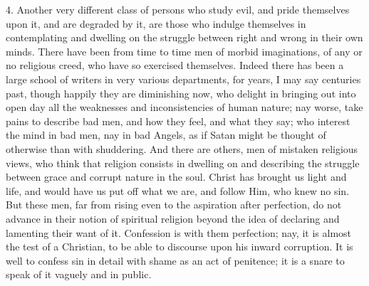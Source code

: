 4. Another very different class of persons who study evil, and
pride themselves upon it, and are degraded by it, are those who
indulge themselves in contemplating and dwelling on the struggle
between right and wrong in their own minds. There have been from time
to time men of morbid imaginations, of any or no religious creed, who
have so exercised themselves. Indeed there has been a large school of
writers in very various departments, for years, I may say centuries
past, though happily they are diminishing now, who delight in bringing
out into open day all the weaknesses and inconsistencies of human
nature; nay worse, take pains to describe bad men, and how they feel,
and what they say; who interest the mind in bad men, nay in bad
Angels, as if Satan might be thought of otherwise than with
shuddering. And there are others, men of mistaken religious views, who
think that religion consists in dwelling on and describing the
struggle between grace and corrupt nature in the soul. Christ has
brought us light and life, and would have us put off what we are,
and
follow Him, who knew no sin. But these men, far from rising even to
the aspiration after perfection, do not advance in their notion of
spiritual religion beyond the idea of declaring and lamenting their
want of it. Confession is with them perfection; nay, it is almost the
test of a Christian, to be able to discourse upon his inward
corruption. It is well to confess sin in detail with shame as an act
of penitence; it is a snare to speak of it vaguely and in public.

